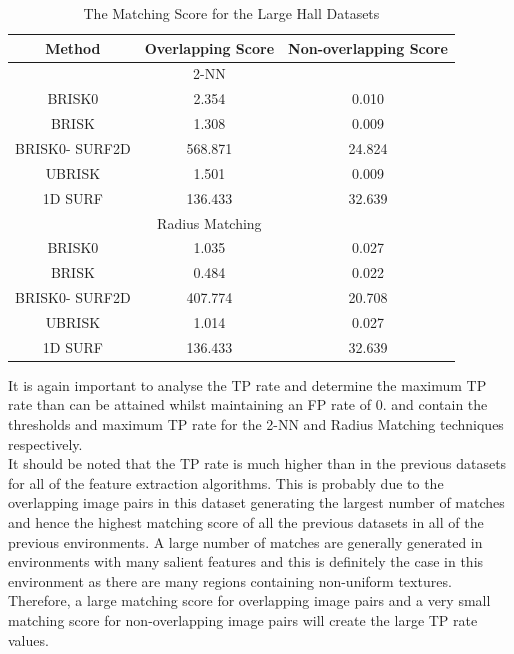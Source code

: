 \documentclass{report}
\begin{document}
\begin{table}
\caption{The Matching Score for the Large Hall Datasets}
\begin{tabular}{|c|c|c|}
\hline 
Method & Overlapping Score & Non-overlapping Score\tabularnewline
\hline 
\hline 
 & 2-NN & \tabularnewline
\hline 
BRISK0 & 2.354 & 0.010\tabularnewline
\hline 
BRISK & 1.308 & 0.009\tabularnewline
\hline 
BRISK0- SURF2D & 568.871 & 24.824\tabularnewline
\hline 
UBRISK & 1.501 & 0.009\tabularnewline
\hline 
1D SURF & 136.433 & 32.639\tabularnewline
\hline 
 & Radius Matching & \tabularnewline
\hline 
BRISK0 & 1.035 & 0.027\tabularnewline
\hline 
BRISK & 0.484 & 0.022\tabularnewline
\hline 
BRISK0- SURF2D & 407.774 & 20.708\tabularnewline
\hline 
UBRISK & 1.014 & 0.027\tabularnewline
\hline 
1D SURF & 136.433 & 32.639\tabularnewline
\hline 
\end{tabular}
\label{tab:lhMS}
\end{table}


It is again important to analyse the TP rate and determine the maximum TP rate than can be attained whilst maintaining an FP rate of $0$.  and  contain the thresholds and maximum TP rate for the 2-NN and Radius Matching techniques respectively.\\

It should be noted that the TP rate is much higher than in the previous datasets for all of the feature extraction algorithms. This is probably due to the overlapping image pairs in this dataset generating the largest number of matches and hence the highest matching score of all the previous datasets in all of the previous environments. A large number of matches are generally generated in environments with many salient features and this is definitely the case in this environment as there are many regions containing non-uniform textures. Therefore, a large matching score for overlapping image pairs and a very small matching score for non-overlapping image pairs will create the large TP rate values.\\
\end{document}
